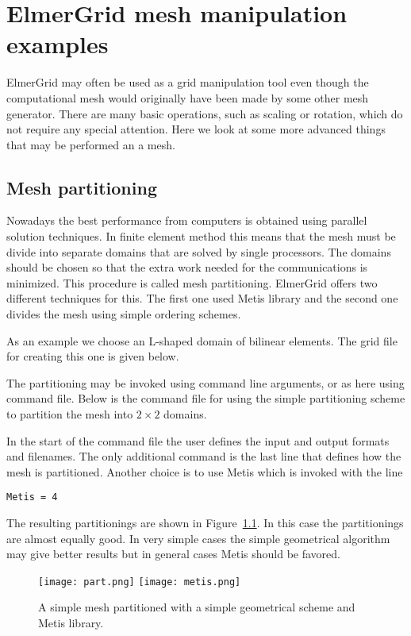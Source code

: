 \chapter{ElmerGrid mesh manipulation examples}

ElmerGrid may often be used as a grid manipulation
tool even though the computational mesh would 
originally have been made by some other mesh
generator. There are many basic 
operations, such as scaling or rotation, which do not 
require any special attention. Here we look at some more 
advanced things that may be performed an a mesh. 



\section{Mesh partitioning}

Nowadays the best performance from computers is obtained using
parallel solution techniques. In finite element method this
means that the mesh must be divide into separate domains 
that are solved by single processors. The domains should 
be chosen so that the extra work needed for the communications is
minimized. This procedure is called mesh partitioning. 
ElmerGrid offers two different techniques for this. 
The first one used Metis library and the second one divides the
mesh using simple ordering schemes. 

As an example we choose an L-shaped domain of bilinear elements.
The grid file for creating this one is given below.


The partitioning may be invoked using command line arguments, or
as here using command file. Below is the command file
for using the simple partitioning scheme to partition the
mesh into $2 \times 2$ domains. 
%

%
In the start of the command file the user defines the input and 
output formats and filenames. The only additional command is the 
last line that defines how the mesh is partitioned.
Another choice is to use Metis which is invoked with the line
\begin{verbatim}
Metis = 4
\end{verbatim}
The resulting partitionings are shown in Figure~\ref{pic50}. In this case
the partitionings are almost equally good. In very simple
cases the simple geometrical algorithm may give better results
but in general cases Metis should be favored.
%
\begin{figure}
\begin{center}
\texttt{[image: part.png]}
\texttt{[image: metis.png]}
\end{center}
\caption{A simple mesh partitioned with a simple geometrical scheme and 
Metis library.}
\label{pic50}
\end{figure}


